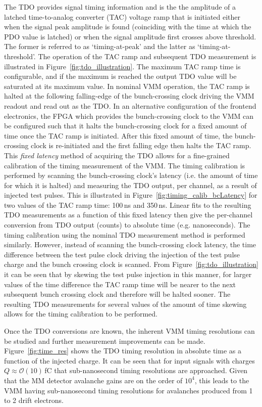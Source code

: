 The TDO provides signal timing information and is the the amplitude of a latched
time-to-analog converter (TAC) voltage ramp that is initiated either when the signal peak
amplitude is found (coinciding with the time at which the PDO value is latched)
or when the signal amplitude first crosses above threshold.
The former is referred to as `timing-at-peak' and the latter as `timing-at-threshold'.
The operation of the TAC ramp and subsequent TDO measurement is illustrated
in Figure~\ref{fig:tdo_illustration}.
The maximum TAC ramp time is configurable, and if the maximum is reached the output
TDO value will be saturated at its maximum value.
In nominal VMM operation, the TAC ramp is halted at the following falling-edge
of the bunch-crossing clock driving the VMM readout and read out as the TDO.
In an alternative configuration of the frontend electronics, the FPGA which
provides the bunch-crossing clock to the VMM can be configured such that
it halts the bunch-crossing clock for a fixed amount of time once the TAC ramp is
initiated.
After this fixed amount of time, the bunch-crossing clock is re-initiated and the first
falling edge then halts the TAC ramp.
This \textit{fixed latency} method of acquiring the TDO allows
for a fine-grained calibration of the timing measurement of the VMM.
The timing calibration is performed by scanning the bunch-crossing clock's latency (i.e.
the amount of time for which it is halted) and measuring the TDO output, per channel,
as a result of injected test pulses.
This is illustrated in Figure~\ref{fig:timing_calib_bcLatency} for two values of the
TAC ramp time: 100\,ns and 350\,ns.
Linear fits to the resulting TDO measurements as a function of this fixed latency
then give the per-channel conversion from TDO output (counts) to absolute time (e.g. nanoseconds).
The timing calibration using the nominal TDO measurement method is performed similarly. However, instead
of scanning the bunch-crossing clock latency, the time difference between the test pulse clock driving
the injection of the test pulse charge and the bunch crossing clock is scanned.
From Figure~\ref{fig:tdo_illustration} it can be seen that by skewing the test pulse injection in
this manner, for larger values of the time difference the TAC ramp time will be nearer to the
next subsequent bunch crossing clock and therefore will be halted sooner.
The resulting TDO measurements for several values of the amount of time skewing allows for the
timing calibration to be performed.

Once the TDO conversions are known, the inherent VMM timing resolutions can be studied and
further measurement improvements can be made.
Figure~\ref{fig:time_res} shows the TDO timing resolution in absolute time as a function
of the injected charge.
It can be seen that for input signals with charges $Q \approx \mathcal{O}(10)$\,fC
that sub-nanosecond timing resolutions are approached.
Given that the MM detector avalanche gains are on the order of $10^4$, this
leads to the VMM having sub-nanosecond timing resolutions for avalanches produced
from 1 to 2 drift electrons.

